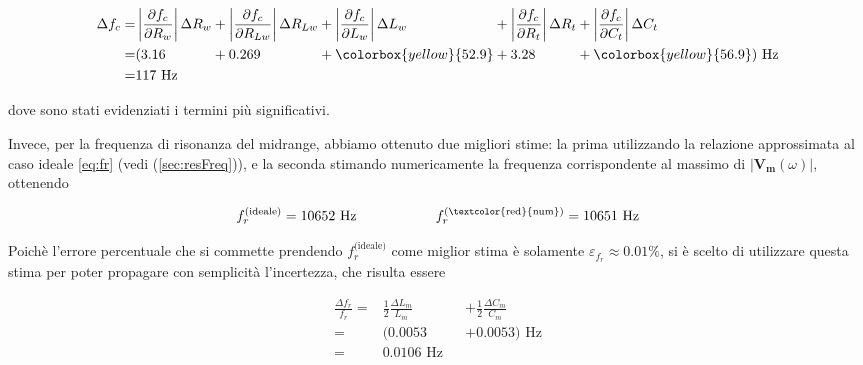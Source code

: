 \documentclass[12pt,italian]{article}
\newcommand{\err}[1]{\textcolor{red}{#1}}
\begin{document}
\begin{equation*}
	\begin{alignedat}{5}
		\Delta f_{c} = & \left|\frac{\partial f_{c}}{\partial R_{w}}\right| \Delta R_{w} &  & +  \left|\frac{\partial f_{c}}{\partial R_{Lw}}\right| \Delta R_{Lw} &  & + \left|\frac{\partial f_{c}}{\partial L_{w}}\right| \Delta L_{w} &  & + \left|\frac{\partial f_{c}}{\partial R_{t}}\right| \Delta R_{t} &  & + \left|\frac{\partial f_{c}}{\partial C_{t}}\right| \Delta C_{t} \\
		=              & ( 3.16                                                          &  & +  0.269                                                             &  & + \colorbox{yellow}{52.9}                                         &  & + 3.28                                                            &  & + \colorbox{yellow}{56.9} ) \text{ Hz}                             \\
		=              & 117 \text{ Hz}
	\end{alignedat}
\end{equation*}

\noindent
dove sono stati evidenziati i termini più significativi.

Invece, per la frequenza di risonanza del midrange, abbiamo ottenuto due
migliori stime: la prima utilizzando la relazione approssimata al caso ideale
\eqref{eq:fr} (vedi (\cref{sec:resFreq})), e la seconda stimando numericamente
la frequenza corrispondente al massimo di $ \left| \mathbf{V_{m}}(\omega)
	\right| $, ottenendo

\begin{equation*}
	f_{r}^{\text{(ideale)}} = 10652 \text{ Hz} \hspace{2cm} f_{r}^{\text{(\err{num})}} = 10651 \text{ Hz}
\end{equation*}

\noindent
Poichè l'errore percentuale che si commette prendendo $f_{r}^{\text{(ideale)}}$ come miglior
stima è solamente  $\varepsilon_{f_r} \approx 0.01\%$, si è scelto di utilizzare questa stima per poter propagare
con semplicità l'incertezza, che risulta essere

\begin{equation*}
	\begin{alignedat}{2}
		\frac{\Delta f_{r}}{f_{r}} = & \frac{1}{2} \frac{\Delta L_{m}}{L_{m}} &  & + \frac{1}{2} \frac{\Delta C_{m}}{C_{m}} \\
		=                            & (0.0053                                &  & + 0.0053) \text{ Hz}                     \\
		=                            & 0.0106 \text{ Hz}
	\end{alignedat}
\end{equation*}
\end{document}
